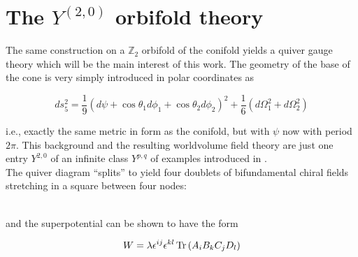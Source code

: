 \section{The $Y^{(2,0)}$ orbifold theory}\label{sec:squares}

The same construction on a $\mathbb{Z}_2$ orbifold of the conifold yields a quiver gauge theory which will be the main interest of this work. The geometry of the base of the cone is very simply introduced in polar coordinates as 

\begin{equation}
	ds^2_5 = \frac{1}{9} (d\psi + \cos\theta_1 d\phi_1 + \cos\theta_2 d\phi_2)^2 + \frac{1}{6} (d\Omega_1^2 + d\Omega_2^2)
\end{equation}

i.e., exactly the same metric in form as the conifold, but with $\psi$ now with period $2\pi$. This background and the resulting worldvolume field theory are just one entry $Y^{2,0}$ of an infinite class $Y^{p,q}$ of examples introduced in \cite{benvenutiInfinite}.\\

The quiver diagram ``splits'' to yield four doublets of bifundamental chiral fields stretching in a square between four nodes:\\


\begin{figure}[!h]
	\centering
{}
\end{figure}

\\

and the superpotential can be shown to have the form

\begin{equation}
	W = \lambda \epsilon^{ij} \epsilon^{kl} \operatorname{Tr}\left( A_i B_k C_j D_l \right)
	\label{}
\end{equation}

